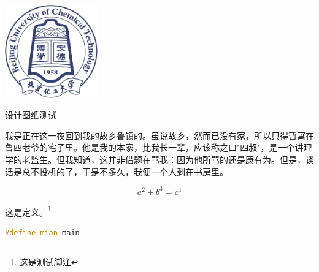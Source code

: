 \begin{dfigure}[tbp]
	\centering\includegraphics[width=4cm]{figure/Logo.pdf}
	\caption{设计图纸测试}
\end{dfigure}

我是正在这一夜回到我的故乡鲁镇的。虽说故乡，然而已没有家，所以只得暂寓在鲁四老爷的宅子里。他是我的本家，比我长一辈，应该称之曰"四叔"，是一个讲理学的老监生。但我知道，这并非借题在骂我：因为他所骂的还是康有为。但是，谈话是总不投机的了，于是不多久，我便一个人剩在书房里。

\begin{equation}
	a^2+b^3=c^4
\end{equation}

\begin{definition}
	这是定义。\footnote{这是测试脚注}
\end{definition}

\begin{lstlisting}[language=c++,caption=一个测试,label=mycode]
#define mian main
	\end{lstlisting}


